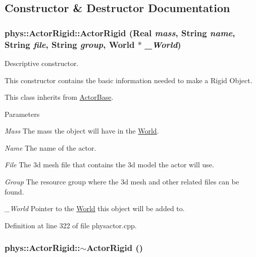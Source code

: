 \subsection{Constructor \& Destructor Documentation}
\hypertarget{classphys_1_1ActorRigid_ac42c05745d57eb5745de3f34e820b72d}{
\subsubsection[{ActorRigid}]{\setlength{\rightskip}{0pt plus 5cm}phys::ActorRigid::ActorRigid ({\bf Real} {\em mass}, \/  {\bf String} {\em name}, \/  {\bf String} {\em file}, \/  {\bf String} {\em group}, \/  {\bf World} $\ast$ {\em \_\-World})}}
\label{d8/d71/classphys_1_1ActorRigid_ac42c05745d57eb5745de3f34e820b72d}


Descriptive constructor. 

This constructor contains the basic information needed to make a Rigid Object. \par
 This class inherits from \hyperlink{classphys_1_1ActorBase}{ActorBase}. 
\begin{DoxyParams}{Parameters}
\item[{\em Mass}]The mass the object will have in the \hyperlink{classphys_1_1World}{World}. \item[{\em Name}]The name of the actor. \item[{\em File}]The 3d mesh file that contains the 3d model the actor will use. \item[{\em Group}]The resource group where the 3d mesh and other related files can be found. \item[{\em \_\-World}]Pointer to the \hyperlink{classphys_1_1World}{World} this object will be added to. \end{DoxyParams}


Definition at line 322 of file physactor.cpp.

\hypertarget{classphys_1_1ActorRigid_ab317b5a2578157e54655a1aea8f4d058}{
\subsubsection[{$\sim$ActorRigid}]{\setlength{\rightskip}{0pt plus 5cm}phys::ActorRigid::$\sim$ActorRigid ()}}
\label{d8/d71/classphys_1_1ActorRigid_ab317b5a2578157e54655a1aea8f4d058}


